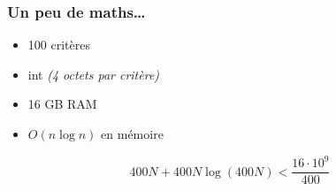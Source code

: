 \begin{frame}
  \vfill

  \vfill
\end{frame}

\begin{frame}
  \frametitle{Un peu de maths\dots}

  \begin{itemize}
  \item 100 critères
  \item int \textit{(4 octets par critère)}
  \item 16 GB RAM
  \item $O(n\log n)$ en mémoire
  \end{itemize}

  \begin{displaymath}
    400 N + 400 N\log (400 N)
    < 
    \frac{16 \cdot 10^{9}}{400}
  \end{displaymath}

\end{frame}



\begin{frame}
\end{frame}


